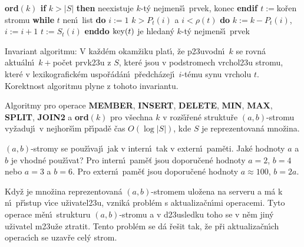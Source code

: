 {\bf ord$(k)$\newline 
if} $k>|S|$ {\bf then} neexistuje $k$-t\'y nejmen\v s\'\i\ prvek, konec 
{\bf endif\newline 
$t:=$}ko\v ren stromu\newline 
{\bf while} $t$ nen\'\i\ list {\bf do}\newline 
\phantom{---}$i:=1$\newline 
\phantom{---}{\bf while} $k>P_t(i)$ a $i<\rho (t)$ {\bf do}\newline 
\phantom{------}$k:=k-P_t(i)$, $i:=i+1$\newline 
\phantom{---}{\bf enddo}\newline 
\phantom{---}$t:=S_t(i)$\newline 
{\bf enddo}\newline 
$\operatorname{key}(t)$ je hledan\'y $k$-t\'y nejmen\v s\'\i\ prvek
\bigskip

\flushpar Invariant algoritmu: V ka\v zd\'em okam\v ziku plat\'\i , 
\v ze p\accent23uvodn\'\i\ $k$ se rovn\'a aktu\'aln\'\i\ $k+$po\v cet prvk\accent23u z 
$S$, kter\'e jsou v podstromech vrchol\accent23u stromu, kter\'e v 
lexikografick\'em uspo\v r\'ad\'an\'\i\ p\v redch\'azej\'\i\ $i$-t\'emu synu 
vrcholu $t$. Korektnost algoritmu plyne z tohoto 
invariantu.


Algoritmy pro operace {\bf MEMBER}, {\bf INSERT}, 
{\bf DE\-LETE}, {\bf MIN}, {\bf MAX}, {\bf SPLIT}, {\bf JOIN2} a {\bf ord$
(k)$} pro v\v sechna $k$ v 
roz\v s\'\i\v ren\'e struktu\v re $(a,b)$-stromu vy\-\v za\-duj\'\i\ v 
nejhor\v s\'\i m p\v r\'\i\-pa\-d\v e \v cas $O(\log|S|)$, kde $S$ je reprezentovan\'a 
mno\v zina.  
\endproclaim


\flushpar $(a,b)$-stromy se pou\v z\'\i vaj\'\i\ jak v intern\'\i\ tak v 
extern\'\i\ pam\v eti. Jak\'e hodnoty $a$ a $b$ je vhodn\'e 
pou\v z\'\i vat?\newline 
Pro intern\'\i\ pam\v e\v t jsou doporu\v cen\'e hodnoty $a=2$, $
b=4$ 
nebo $a=3$ a $b=6$.\newline 
Pro extern\'\i\ pam\v e\v t jsou doporu\v cen\'e hodnoty $a\approx 
100$, 
$b=2a$.
\medskip

\flushpar Kdy\v z je mno\v zina reprezentovan\'a $(a,b)$-stromem 
ulo\v zena na serveru a m\'a k n\'\i\ p\v r\'\i stup v\'\i ce 
u\v zivatel\accent23u, vznik\'a probl\'em s aktualiza\v cn\'\i mi 
operacemi. Tyto operace m\v en\'\i\ strukturu $(a,b)$-stromu a 
v d\accent23usledku toho se v n\v em jin\'y u\v zivatel 
m\accent23u\v ze ztratit. Tento probl\'em se d\'a  
\v re\v sit tak, \v ze p\v ri aktu\-aliza\v cn\'\i ch operac\'\i ch 
se uzav\v re cel\'y strom.
\medskip 

